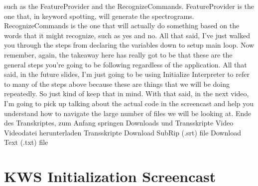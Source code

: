       such as the FeatureProvider and the RecognizeCommands.
      FeatureProvider is the one that, in keyword spotting,
      will generate the spectrograms.
      RecognizeCommands is the one that will actually
      do something based on the words that it might recognize, such as yes and no.
      All that said, I've just walked you through the steps
      from declaring the variables down to setup main loop.
      Now remember, again, the takeaway here has really
      got to be that these are the general steps you're going to be following
      regardless of the application.
      All that said, in the future slides, I'm just
      going to be using Initialize Interpreter to refer to many of the steps
      above because these are things that we will be doing repeatedly.
      So just kind of keep that in mind.
      With that said, in the next video, I'm going
      to pick up talking about the actual code in the screencast
      and help you understand how to navigate the large number of files
      we will be looking at.
      Ende des Transkriptes, zum Anfang springen
      Downloads und Transskripte
      Video
      Videodatei herunterladen
      Transskripte
      Download SubRip (.srt) file
      Download Text (.txt) file 
      
\section{KWS Initialization Screencast}

